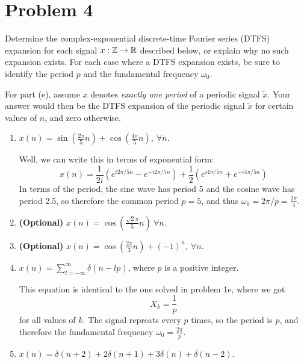 \documentclass[10pt]{article}
\begin{document}
	\pagebreak
	\section*{Problem 4} 
	Determine the complex-exponential discrete-time Fourier series (DTFS) expansion for each signal \( x: 
	\mathbb Z \to \mathbb R\) described below, or explain why no such expansion exists. For each case where a DTFS expansion exists, 
	be sure to identify the period \( p \) and the fundamental frequency \( \omega_0 \). 
	
	For part (e), assume \( x \) denotes \textit{exactly one period} of a periodic signal \( \tilde x \). Your answer
	 would then be the DTFS expansion of the periodic signal \( \tilde x \) for certain values of \( n \), and 
	 zero otherwise.

	 \begin{enumerate}[label=\alph*)]
	 	\item \( x(n) = \sin\left( \frac{2\pi}{5}n \right)  + \cos\left( \frac{4\pi}{5}n \right) , \ \forall n \).

			\begin{solution}
				Well, we can write this in terms of exponential form:
				\[
				x(n) = \frac{1}{2i}(e^{i 2 \pi / 5 n} - e^{-i 2 \pi / 5 n}) 
				+ \frac{1}{2}(e^{i 4 \pi / 5 n} + e^{- i 4 \pi / 5 n})
				\] 
				In terms of the period, the sine wave has period 5 and the cosine wave has period 2.5, so therefore
				the common period  \( p = 5 \), and thus \( \omega_0 = 2\pi / p = \frac{2\pi}{5} \).
			\end{solution}
		\item \textbf{(Optional)} \( x(n) = \cos\left( \frac{\sqrt{2} \pi}{5}n \right) \ \forall n \). 
		\item \textbf{(Optional)} \( x(n) = \cos\left( \frac{2\pi}{3}n \right)  + (-1)^{n}, \ \forall n \).
		\item \( x(n) = \sum_{l=-\infty}^{\infty} \delta(n - lp) \), where \( p \) is a positive integer. 

			\begin{solution}
				This equation is identical to the one solved in problem 1e, where we got 
				\[
				X_k = \frac{1}{p}
				\] 
				for all values of \( k \). The signal repreats every \( p \) times, so the period is \( p \), 
				and therefore the fundamental frequency \( \omega_0 = \frac{2\pi}{p} \).
			\end{solution}
		\item \( x(n) = \delta( n + 2) + 2\delta(n+1) + 3\delta(n) + \delta(n - 2) \). 


\end{enumerate}
\end{document}
